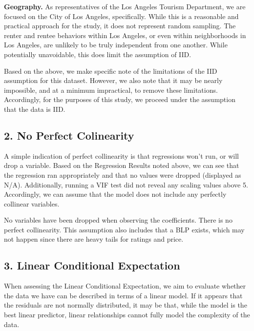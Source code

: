 \documentclass[
]{article}
\begin{document}
\textbf{Geography.} As representatives of the Los Angeles Tourism Department, we are focused on the City of Los Angeles, specifically. While this is a reasonable and practical approach for the study, it does not represent random sampling. The renter and rentee behaviors within Los Angeles, or even within neighborhoods in Los Angeles, are unlikely to be truly independent from one another. While potentially unavoidable, this does limit the assumption of IID.

Based on the above, we make specific note of the limitations of the IID assumption for this dataset. However, we also note that it may be nearly impossible, and at a minimum impractical, to remove these limitations. Accordingly, for the purposes of this study, we proceed under the assumption that the data is IID.

\hypertarget{no-perfect-colinearity}{%
\subsection{\texorpdfstring{\textbf{2. No Perfect Colinearity}}{2. No Perfect Colinearity}}\label{no-perfect-colinearity}}

A simple indication of perfect collinearity is that regressions won't run, or will drop a variable.
Based on the Regression Results noted above, we can see that the regression ran appropriately and that no values were dropped (displayed as N/A).
Additionally, running a VIF test did not reveal any scaling values above 5.
Accordingly, we can assume that the model does not include any perfectly collinear variables.

No variables have been dropped when observing the coefficients. There is no perfect collinearity. This assumption also includes that a BLP exists, which may not happen since there are heavy tails for ratings and price.

\hypertarget{linear-conditional-expectation}{%
\subsection{\texorpdfstring{\textbf{3. Linear Conditional Expectation}}{3. Linear Conditional Expectation}}\label{linear-conditional-expectation}}

When assessing the Linear Conditional Expectation, we aim to evaluate whether the data we have can be described in terms of a linear model. If it appears that the residuals are not normally distributed, it may be that, while the model is the best linear predictor, linear relationships cannot fully model the complexity of the data.
\end{document}
